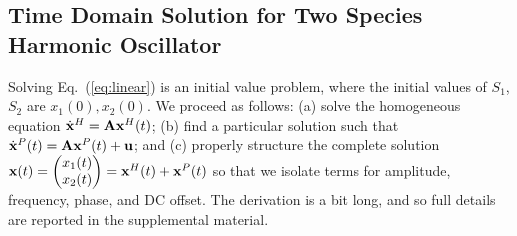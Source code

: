 \documentclass{bmcart}
\newcommand{\eqn}[1]{Eq.~(\ref{#1})}
\begin{document}

\subsection*{Time Domain Solution for Two Species Harmonic Oscillator}
Solving \eqn{eq:linear} is an initial value problem, where the initial values
of $S_1$, $S_2$ are $x_1(0), x_2(0)$.
We proceed as follows:
(a) solve the homogeneous equation $\dot{\bf x}^H = {\bf A} {\bf x}^H(t)$; 
(b) find a particular solution such that  $\dot{{\bf x}}^P (t) = {\bf A} {\bf x}^P(t) + {\bf u}$; and (c) properly structure the complete solution ${\bf x}(t) = \begin{pmatrix} x_1 (t) \\ x_2(t) \end{pmatrix} = {\bf x}^H (t) + {\bf x}^P (t)$ so that we isolate terms for amplitude, frequency, phase, and DC offset. The derivation is a bit long, and so full details are reported in the supplemental material.
\end{document}
